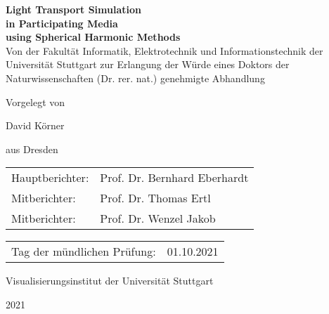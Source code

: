 \begin{titlepage}
 
\begin{center}
	\textbf{\huge Light Transport Simulation}\\ 
	\vspace{0.3cm}
	\textbf{\huge in Participating Media}\\ 
	\vspace{0.3cm}
	\textbf{\huge using Spherical Harmonic Methods}\\
	
	\vspace{1.5cm}	
	\large Von der Fakultät Informatik, Elektrotechnik und Informationstechnik der Universität Stuttgart zur Erlangung der Würde eines Doktors der Naturwissenschaften (Dr. rer. nat.) genehmigte Abhandlung
	
	\vspace{1.8cm}
	Vorgelegt von
	
	\vspace{0.2cm}
	\huge David Körner
	
	\vspace{0.2cm}
	\large aus Dresden
	\large \
	
	\vspace{1.8cm}	
	\begin{longtable}{l l}
	Hauptberichter: & Prof. Dr. Bernhard Eberhardt \\
	Mitberichter: & Prof. Dr. Thomas Ertl \\
	Mitberichter: & Prof. Dr. Wenzel Jakob\\
	\end{longtable}
	\begin{longtable}{l l}
	Tag der mündlichen Prüfung: & 01.10.2021
	\end{longtable}
		
	\vspace{1.4cm}
	Visualisierungsinstitut der Universität Stuttgart
	
	2021
\end{center}
\vspace{1cm}
\end{titlepage}


